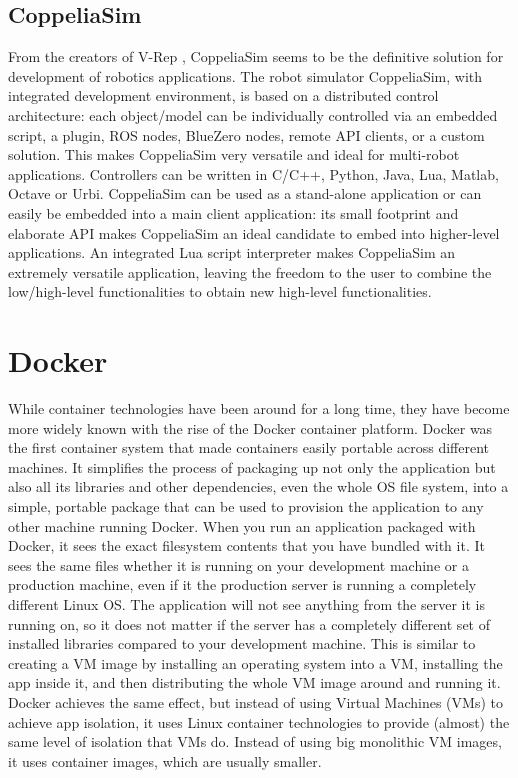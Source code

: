 
\subsection{CoppeliaSim}
From the creators of V-Rep \cite{VREP}, CoppeliaSim \cite{coppeliaSim} seems to be the definitive solution for development of robotics applications.
The robot simulator CoppeliaSim, with integrated development environment, is based on a distributed control architecture: each object/model can be individually controlled via an embedded script, a plugin, ROS nodes, BlueZero nodes, remote API clients, or a custom solution. This makes CoppeliaSim very versatile and ideal for multi-robot applications. Controllers can be written in C/C++, Python, Java, Lua, Matlab, Octave or Urbi.
CoppeliaSim can be used as a stand-alone application or can easily be embedded into a main client application: its small footprint and elaborate API makes CoppeliaSim an ideal candidate to embed into higher-level applications. An integrated Lua script interpreter makes CoppeliaSim an extremely versatile application, leaving the freedom to the user to combine the low/high-level functionalities to obtain new high-level functionalities.




\section{Docker}
While container technologies have been around for a long time, they have become more widely known with the rise of the Docker container platform. Docker was the first container system that made containers easily portable across different machines. It simplifies the process of packaging up not only the application but also all its libraries and other dependencies, even the whole OS file system, into a simple, portable package that can be used to provision the application to any other machine running Docker. When you run an application packaged with Docker, it sees the exact filesystem contents that you have bundled with it. It sees the same files whether it is running on your development machine or a production machine, even if it the production server is running a completely different Linux OS. The application will not see anything from the server it is running on, so it does not matter if the server has a completely different set of installed libraries compared to your development machine.
This is similar to creating a VM image by installing an operating system into a VM, installing the app inside it, and then distributing the whole VM image around and running it. Docker achieves the same effect, but instead of using Virtual Machines (VMs) to achieve app isolation, it uses Linux container technologies to provide (almost) the same level of isolation that VMs do. Instead of using big monolithic VM images, it uses container images, which are usually smaller.


